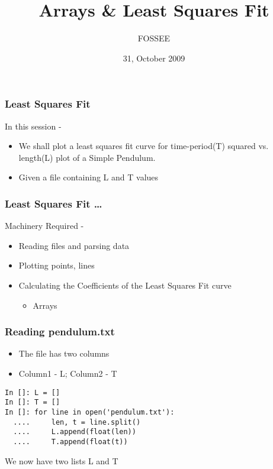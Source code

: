 \documentclass[14pt,compress]{beamer}
\title[]{Arrays \& Least Squares Fit}
\author[FOSSEE] {FOSSEE}
\institute[IIT Bombay] {Department of Aerospace Engineering\\IIT Bombay}
\date[] {31, October 2009}
\newcounter{time}
\begin{document}
\begin{frame}
  \maketitle
\end{frame}


\begin{frame}
\frametitle{Least Squares Fit}
In this session - 
\begin{itemize}
\item We shall plot a least squares fit curve for time-period(T) squared vs. length(L) plot of a Simple Pendulum. 
\item Given a file containing L and T values
\end{itemize}
\end{frame}

\begin{frame}
\frametitle{Least Squares Fit \ldots}
Machinery Required -
\begin{itemize}
\item Reading files and parsing data
\item Plotting points, lines
\item Calculating the Coefficients of the Least Squares Fit curve
\begin{itemize}
  \item Arrays
\end{itemize}
\end{itemize}
\end{frame}

\begin{frame}[fragile]
\frametitle{Reading pendulum.txt}
\begin{itemize}
  \item The file has two columns
  \item Column1 - L; Column2 - T
\end{itemize}
\begin{lstlisting}
In []: L = []
In []: T = []
In []: for line in open('pendulum.txt'):
  ....     len, t = line.split()
  ....     L.append(float(len))
  ....     T.append(float(t))
\end{lstlisting}
We now have two lists L and T
\end{frame}
\end{document}
